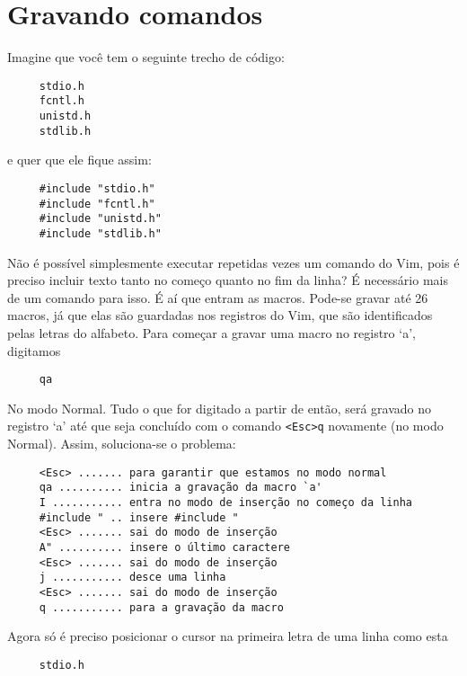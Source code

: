 \section{Gravando comandos}
\label{sec:Gravando comandos}

Imagine que você tem o seguinte trecho de código:

\begin{verbatim}
     stdio.h
     fcntl.h
     unistd.h
     stdlib.h
\end{verbatim}

e quer que ele fique assim:

\begin{verbatim}
     #include "stdio.h"
     #include "fcntl.h"
     #include "unistd.h"
     #include "stdlib.h"
\end{verbatim}

Não é possível simplesmente executar repetidas vezes um comando do Vim, pois
é preciso incluir texto tanto no começo quanto no fim da linha?  É necessário
mais de um comando para isso.  É aí que entram as macros. Pode-se gravar até 26
macros, já que elas são guardadas nos registros do Vim, que são identificados
pelas letras do alfabeto. Para começar a gravar uma macro no registro `a',
digitamos

\begin{verbatim}
     qa
\end{verbatim}

No modo Normal. Tudo o que for digitado a partir de então, será gravado no
registro `a' até que seja concluído com o comando
\verb|<Esc>q| novamente (no modo Normal). Assim,
soluciona-se o problema:

\begin{verbatim}
     <Esc> ....... para garantir que estamos no modo normal
     qa .......... inicia a gravação da macro `a'
     I ........... entra no modo de inserção no começo da linha
     #include " .. insere #include "
     <Esc> ....... sai do modo de inserção
     A" .......... insere o último caractere
     <Esc> ....... sai do modo de inserção
     j ........... desce uma linha
     <Esc> ....... sai do modo de inserção
     q ........... para a gravação da macro
\end{verbatim}

Agora só é preciso posicionar o cursor na primeira letra de uma linha como esta

\begin{verbatim}
     stdio.h
\end{verbatim}

